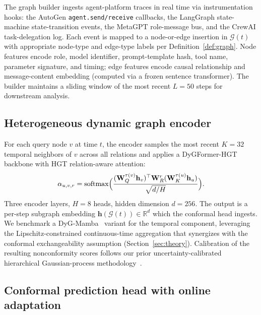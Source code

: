 \documentclass[12pt,a4paper]{article}
\theoremstyle{definition}
\theoremstyle{remark}
\newcommand{\R}{\mathbb{R}}
\newcommand{\Gcal}{\mathcal{G}}
\DeclareMathOperator{\softmax}{softmax}
\begin{document}
The graph builder ingests agent-platform traces in real time via instrumentation hooks: the AutoGen \texttt{agent.send/receive} callbacks, the LangGraph state-machine state-transition events, the MetaGPT role-message bus, and the CrewAI task-delegation log. Each event is mapped to a node-or-edge insertion in $\Gcal(t)$ with appropriate node-type and edge-type labels per Definition~\ref{def:graph}. Node features encode role, model identifier, prompt-template hash, tool name, parameter signature, and timing; edge features encode causal relationship and message-content embedding (computed via a frozen sentence transformer). The builder maintains a sliding window of the most recent $L = 50$ steps for downstream analysis.

\subsection{Heterogeneous dynamic graph encoder}
\label{subsec:dgnn}

For each query node $v$ at time $t$, the encoder samples the most recent $K = 32$ temporal neighbors of $v$ across all relations and applies a DyGFormer-HGT~\cite{yu2023dygformer,hu2020hgt} backbone with HGT relation-aware attention:
\begin{equation}
    \alpha_{u, v, r} = \softmax\Bigl(\frac{(\mathbf{W}_Q^{\tau(v)} \mathbf{h}_v)^\top \mathbf{W}_R^r (\mathbf{W}_K^{\tau(u)} \mathbf{h}_u)}{\sqrt{d/H}}\Bigr).
\end{equation}
Three encoder layers, $H = 8$ heads, hidden dimension $d = 256$. The output is a per-step subgraph embedding $\mathbf{h}(\Gcal(t)) \in \R^d$ which the conformal head ingests. We benchmark a DyG-Mamba~\cite{li2025dygmamba} variant for the temporal component, leveraging the Lipschitz-constrained continuous-time aggregation that synergizes with the conformal exchangeability assumption (Section~\ref{sec:theory}). Calibration of the resulting nonconformity scores follows our prior uncertainty-calibrated hierarchical Gaussian-process methodology~\cite{anaedevha2026uchgp}.

\subsection{Conformal prediction head with online adaptation}
\label{subsec:conformal}
\end{document}
